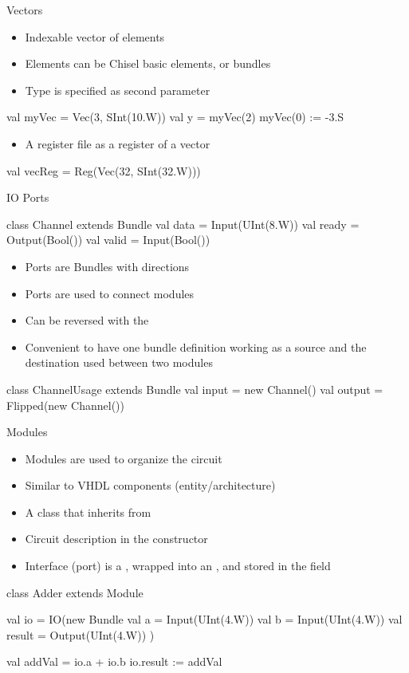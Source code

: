 \begin{frame}[fragile]{Vectors}
\begin{itemize}
\item Indexable vector of elements
\item Elements can be Chisel basic elements, or bundles
\item Type is specified as second parameter
\end{itemize}
\begin{chisel}
val myVec = Vec(3, SInt(10.W))
val y = myVec(2)
myVec(0) := -3.S
\end{chisel}
\begin{itemize}
\item A register file as a register of a vector
\end{itemize}
\begin{chisel}
val vecReg = Reg(Vec(32, SInt(32.W)))
\end{chisel}
\end{frame}

\begin{frame}[fragile]{IO Ports}
\begin{chisel}
class Channel extends Bundle {
  val data = Input(UInt(8.W))
  val ready = Output(Bool())
  val valid = Input(Bool())
}
\end{chisel}
\begin{itemize}
\item Ports are Bundles with directions
\item Ports are used to connect modules
\item Can be reversed with the 
\item Convenient to have one bundle definition working as a source
and the destination used between two modules
\end{itemize}
\begin{chisel}
class ChannelUsage extends Bundle {
  val input = new Channel()
  val output = Flipped(new Channel())
}
\end{chisel}
\end{frame}


\begin{frame}[fragile]{Modules}
\begin{itemize}
\item Modules are used to organize the circuit
\item Similar to VHDL components (entity/architecture)
\item A class that inherits from 
\item Circuit description in the constructor
\item Interface (port) is a , wrapped into an , and stored in the field 
\end{itemize}
\begin{chisel}
class Adder extends Module {
  val io = IO(new Bundle {
    val a = Input(UInt(4.W))
    val b = Input(UInt(4.W))
    val result = Output(UInt(4.W))
  })

  val addVal = io.a + io.b
  io.result := addVal
}
\end{chisel}
\end{frame}

